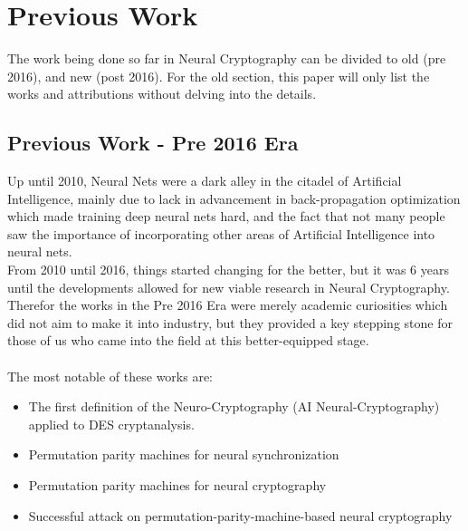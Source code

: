 \documentclass[a4paper, 12pt]{report}
\begin{document}
\section{\textbf{Previous Work}}
The work being done so far in Neural Cryptography can be divided to old (pre 2016), and new (post 2016). For the old section, this paper will only list the works and attributions without delving into the details.
\subsection{\textbf{Previous Work - Pre 2016 Era}}
Up until 2010, Neural Nets were a dark alley in the citadel of Artificial Intelligence, mainly due to lack in advancement in back-propagation optimization which made training deep neural nets hard, and the fact that not many people saw the importance of incorporating other areas of Artificial Intelligence into neural nets.\\ From 2010 until 2016, things started changing for the better, but it was 6 years until the developments allowed for new viable research in Neural Cryptography.\\
Therefor the works in the Pre 2016 Era were merely academic curiosities which did not aim to make it into industry, but they provided a key stepping stone for those of us who came into the field at this better-equipped stage.\\\\
The most notable of these works are:
\begin{itemize}[nosep]
	\item The first definition of the Neuro-Cryptography (AI Neural-Cryptography) applied to DES cryptanalysis. ~\citep{s.dourlens.free.fr/AppliedNeuroCryptography}
	\item Permutation parity machines for neural synchronization ~\citep{1751-8121-42-19-195002}
	\item Permutation parity machines for neural cryptography ~\citep{PhysRevE.81.066117}
	\item Successful attack on permutation-parity-machine-based neural cryptography ~\citep{PhysRevE.85.025101}
\end{itemize}
\end{document}
